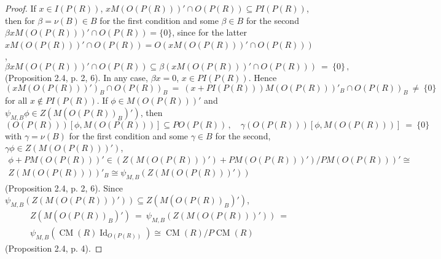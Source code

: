\documentclass[10pt,a4paper]{amsart}
\DeclareMathOperator{\CM}{CM}
\DeclareMathOperator{\Id}{Id}
\begin{document}
\begin{proof}
If ${x\in I(P(R))}$, ${x M(O(P(R)))'\cap O(P(R))\subseteq P I(P(R))}$, then for 
${\beta=\nu(B)\in B}$ for the first condition and some ${\beta\in B}$ 
for the second ${\beta x M(O(P(R)))'\cap O(P(R))=\{0\}}$, since for the latter 
${x M(O(P(R)))'\cap O(P(R))=O(x M(O(P(R)))'\cap O(P(R)))}$, 
\[
\beta x M(O(P(R)))'\cap O(P(R))\subseteq \beta (x M(O(P(R)))'\cap O(P(R)))\ =\ 
\{0\}\,,
\]
(Proposition 2.4, p. 2, 6). In any case, ${\beta x=0}$, ${x\in P I(P(R))}$. 
Hence 
\[
(x M(O(P(R)))')_B\cap O(P(R))_B\ =\ (x+P I(P(R))) M(O(P(R)))'_B\cap O(P(R))_B
\ \ne\ \{0\}
\] 
for all ${x\notin P I(P(R))}$. If ${\phi\in M(O(P(R)))'}$ and 
${\psi_{M, B} \phi\in Z(M(O(P(R))_B)')}$, then  
\[
(O(P(R)))[\phi, M(O(P(R)))]\subseteq P O(P(R))\,,\quad 
\gamma (O(P(R)))[\phi, M(O(P(R)))]\ =\ 
\{0\}
\]
with ${\gamma=\nu(B)}$ for the first condition and some ${\gamma\in B}$ for 
the second, ${\gamma \phi\in Z(M(O(P(R)))')}$, 
\begin{multline*}
\phi+P M(O(P(R)))'\in (Z(M(O(P(R)))')+P M(O(P(R)))')/P M(O(P(R)))'\cong
\\
Z(M(O(P(R))))'_B\cong \psi_{M, B}(Z(M(O(P(R)))'))
\end{multline*}
(Proposition 2.4, p. 2, 6). Since 
${\psi_{M, B}(Z(M(O(P(R)))'))\subseteq Z(M(O(P(R))_B)')}$, 
\begin{multline*}
Z(M(O(P(R))_B)')\ =\ \psi_{M, B}(Z(M(O(P(R)))'))\ =
\\ 
\psi_{M, B}(\CM(R) \Id_{O(P(R))})\cong \CM(R)/P \CM(R)
\end{multline*}
(Proposition 2.4, p. 4).


\end{proof}
\end{document}
